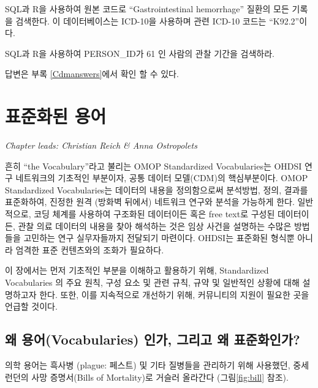 \documentclass[11pt]{book}
\theoremstyle{definition}
\theoremstyle{definition}
\theoremstyle{definition}
\theoremstyle{remark}
\let\BeginKnitrBlock\begin \let\EndKnitrBlock\end
\begin{document}
\BeginKnitrBlock{exercise}
\protect\hypertarget{exr:exercisePersonSource}{}{\label{exr:exercisePersonSource}
}SQL과 R을 사용하여 원본 코드로 ``Gastrointestinal hemorrhage'' 질환의
모든 기록을 검색한다. 이 데이터베이스는 ICD-10을 사용하며 관련 ICD-10
코드는 ``K92.2''이다.
\EndKnitrBlock{exercise}

\BeginKnitrBlock{exercise}
\protect\hypertarget{exr:exercisePerson61Records}{}{\label{exr:exercisePerson61Records}
}SQL과 R을 사용하여 PERSON\_ID가 61 인 사람의 관찰 기간을 검색하라.
\EndKnitrBlock{exercise}

답변은 부록 \ref{Cdmanswers}에서 확인 할 수 있다.

\chapter{표준화된 용어}\label{StandardizedVocabularies}


\emph{Chapter leads: Christian Reich \& Anna Ostropolets}

흔히 ``the Vocabulary''라고 불리는 OMOP Standardized Vocabularies는
OHDSI 연구 네트워크의 기초적인 부분이자, 공통 데이터 모델(CDM)의
핵심부분이다. OMOP Standardized Vocabularies는 데이터의 내용을
정의함으로써 분석방법, 정의, 결과를 표준화하여, 진정한 원격 (방화벽
뒤에서) 네트워크 연구와 분석을 가능하게 한다. 일반적으로, 코딩 체계를
사용하여 구조화된 데이터이든 혹은 free text로 구성된 데이터이든, 관찰
의료 데이터의 내용을 찾아 해석하는 것은 임상 사건을 설명하는 수많은
방법들을 고민하는 연구 실무자들까지 전달되기 마련이다. OHDSI는 표준화된
형식뿐 아니라 엄격한 표준 컨텐츠와의 조화가 필요하다.

이 장에서는 먼저 기초적인 부분을 이해하고 활용하기 위해, Standardized
Vocabularies 의 주요 원칙, 구성 요소 및 관련 규칙, 규약 및 일반적인
상황에 대해 설명하고자 한다. 또한, 이를 지속적으로 개선하기 위해,
커뮤니티의 지원이 필요한 곳을 언급할 것이다.

\section{왜 용어(Vocabularies) 인가, 그리고 왜
표준화인가?}\label{-vocabularies----}

의학 용어는 흑사병 (plague: 페스트) 및 기타 질병들을 관리하기 위해
사용했던, 중세 런던의 사망 증명서(Bills of Mortality)로 거슬러 올라간다
(그림\ref{fig:bill} 참조). 
\end{document}
